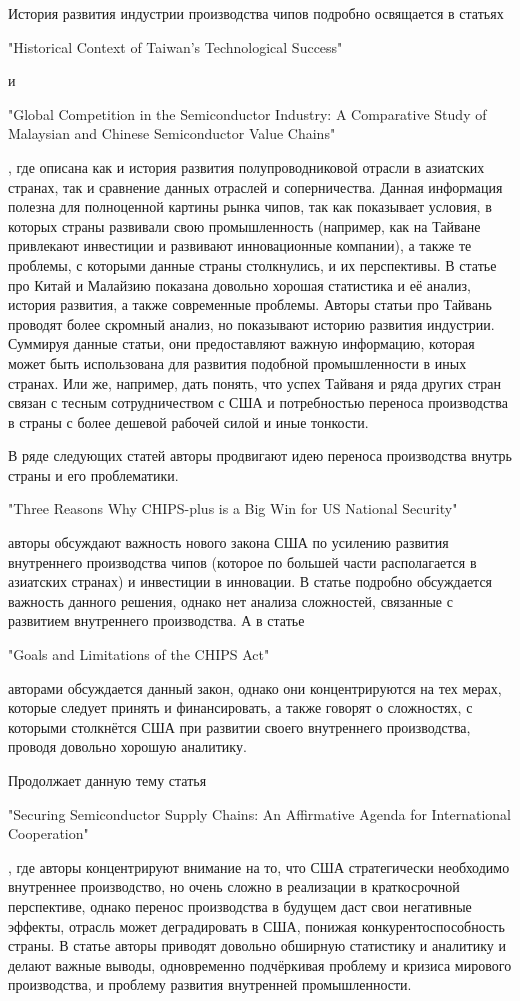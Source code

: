 \documentclass[14pt, a4paper]{extarticle}
\begin{document}
История развития индустрии производства чипов подробно освящается в статьях \begin{english}"Historical Context of Taiwan’s Technological Success"\end{english} и \begin{english} "Global Competition in the Semiconductor Industry: A Comparative Study of Malaysian and Chinese Semiconductor Value Chains"\end{english}, где описана как и история развития полупроводниковой отрасли в азиатских странах, так и сравнение данных отраслей и соперничества. Данная информация полезна для полноценной картины рынка чипов, так как показывает условия, в которых страны развивали свою промышленность (например, как на Тайване привлекают инвестиции и развивают инновационные компании), а также те проблемы, с которыми данные страны столкнулись, и их перспективы. В статье про Китай и Малайзию показана довольно хорошая статистика  и её анализ, история развития, а также современные проблемы. Авторы статьи про Тайвань проводят более скромный анализ, но показывают историю развития индустрии. Суммируя данные статьи, они предоставляют важную информацию, которая может быть использована для развития подобной промышленности в иных странах. Или же, например, дать понять, что успех Тайваня и ряда других стран связан с тесным сотрудничеством с США и потребностью переноса производства в страны с более дешевой рабочей  силой и иные тонкости. 

В ряде следующих статей авторы продвигают идею переноса производства внутрь страны и его проблематики.\begin{english} "Three Reasons Why CHIPS-plus is a Big Win for US National
Security"\end{english} авторы обсуждают важность нового закона США по усилению развития внутреннего производства чипов (которое по большей части располагается в азиатских странах)  и инвестиции в инновации. В статье подробно обсуждается важность данного решения, однако нет анализа сложностей, связанные с развитием внутреннего производства. А в статье \begin{english} "Goals and Limitations of the CHIPS Act"\end{english} авторами обсуждается данный закон, однако они концентрируются на тех мерах, которые следует принять  и финансировать, а также говорят о сложностях, с которыми столкнётся США при развитии своего внутреннего производства, проводя довольно хорошую аналитику. 

Продолжает данную тему статья \begin{english}"Securing Semiconductor Supply Chains: An Affirmative Agenda for International Cooperation"\end{english}, где авторы концентрируют внимание на то, что США стратегически необходимо внутреннее производство, но очень сложно в реализации в краткосрочной перспективе, однако перенос производства в будущем даст свои негативные эффекты, отрасль может деградировать в США, понижая конкурентоспособность страны. В статье авторы приводят довольно обширную статистику и аналитику и делают важные выводы, одновременно подчёркивая проблему и кризиса мирового производства, и проблему развития внутренней промышленности. 
\end{document}
